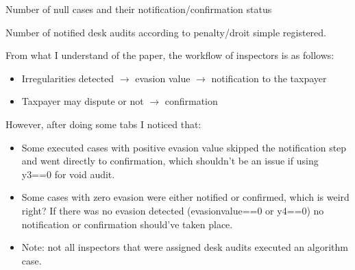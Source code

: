 \documentclass{article}
\newcommand{\OutPath}{Output/}%
\newcommand{\OutPath}{../Output/}%
\begin{document}
\begin{table}[H]
    \centering
    \caption{Number of null cases and their notification/confirmation status}
    \begin{adjustbox}{max width=\textwidth}
    
    \label{tab:nullsandconfirmation}
    \end{adjustbox}
\end{table}

\begin{table}[H]
    \centering
    \caption{Number of notified desk audits according to  penalty/droit simple registered.}
    \begin{adjustbox}{max width=\textwidth}
    
    \label{tab:nullsandconfirmation}
    \end{adjustbox}
\end{table}


From what I understand of the paper, the workflow of inspectors is as follows:
\begin{itemize}
\item{Irregularities detected  $\rightarrow$ evasion value  $\rightarrow$ notification to the taxpayer} 
\item{Taxpayer may dispute or not $\rightarrow$ confirmation}
\end{itemize}

However, after doing some  tabs I noticed that: 


\begin{itemize}
\item{Some executed cases with positive evasion value skipped the notification step and went directly to confirmation, which shouldn't be an issue if using y3==0 for void audit.}
\item{Some cases with zero evasion were either notified or confirmed, which is weird right? If there was no evasion detected (evasionvalue==0 or y4==0) no notification or confirmation should've taken place.}
\end{itemize}
\begin{itemize}
    \item{Note: not all inspectors that were assigned desk audits executed an algorithm case.}
\end{itemize}
\end{document}
